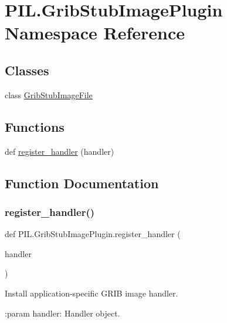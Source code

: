 \hypertarget{namespacePIL_1_1GribStubImagePlugin}{}\section{P\+I\+L.\+Grib\+Stub\+Image\+Plugin Namespace Reference}
\label{namespacePIL_1_1GribStubImagePlugin}
\subsection*{Classes}
\begin{DoxyCompactItemize}
\item 
class \hyperlink{classPIL_1_1GribStubImagePlugin_1_1GribStubImageFile}{Grib\+Stub\+Image\+File}
\end{DoxyCompactItemize}
\subsection*{Functions}
\begin{DoxyCompactItemize}
\item 
def \hyperlink{namespacePIL_1_1GribStubImagePlugin_a62bc9d49a66bb8e825cba572af84fe0c}{register\+\_\+handler} (handler)
\end{DoxyCompactItemize}


\subsection{Function Documentation}
\mbox{\label{namespacePIL_1_1GribStubImagePlugin_a62bc9d49a66bb8e825cba572af84fe0c}} 
\subsubsection{\texorpdfstring{register\+\_\+handler()}{register\_handler()}}
{\footnotesize\ttfamily def P\+I\+L.\+Grib\+Stub\+Image\+Plugin.\+register\+\_\+handler (\begin{DoxyParamCaption}\item[{}]{handler }\end{DoxyParamCaption})}

\begin{DoxyVerb}Install application-specific GRIB image handler.

:param handler: Handler object.
\end{DoxyVerb}
 